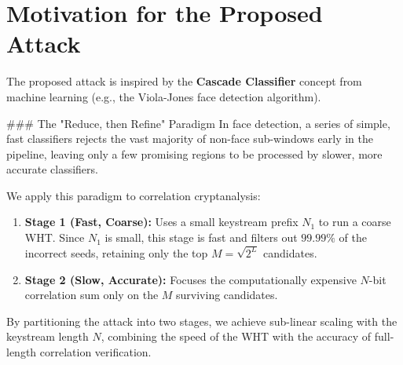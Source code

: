 \section{Motivation for the Proposed Attack}
\label{sec:motivation_cascade}

The proposed attack is inspired by the \textbf{Cascade Classifier} concept from machine learning (e.g., the Viola-Jones face detection algorithm). 

### The "Reduce, then Refine" Paradigm
In face detection, a series of simple, fast classifiers rejects the vast majority of non-face sub-windows early in the pipeline, leaving only a few promising regions to be processed by slower, more accurate classifiers. 

We apply this paradigm to correlation cryptanalysis:
\begin{enumerate}
    \item \textbf{Stage 1 (Fast, Coarse):} Uses a small keystream prefix $N_1$ to run a coarse WHT. Since $N_1$ is small, this stage is fast and filters out $99.99\%$ of the incorrect seeds, retaining only the top $M = \sqrt{2^L}$ candidates.
    \item \textbf{Stage 2 (Slow, Accurate):} Focuses the computationally expensive $N$-bit correlation sum only on the $M$ surviving candidates.
\end{enumerate}

By partitioning the attack into two stages, we achieve sub-linear scaling with the keystream length $N$, combining the speed of the WHT with the accuracy of full-length correlation verification.
